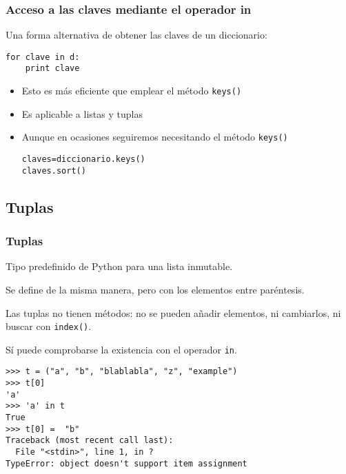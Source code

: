 \documentclass[ucs]{beamer}
\begin{document}
\begin{frame}[fragile]
\frametitle{Acceso a las claves mediante el operador in}

Una forma alternativa de obtener las claves de un diccionario:

  \begin{footnotesize}
  \begin{verbatim}
for clave in d:
    print clave
  \end{verbatim}
  \end{footnotesize}


\begin{itemize}
\item
Esto es más eficiente que emplear el método
 \verb|keys()|
\item
Es aplicable a listas y tuplas
\item
Aunque en ocasiones seguiremos necesitando el método 
 \verb|keys()|

  \begin{footnotesize}
  \begin{verbatim}
claves=diccionario.keys()
claves.sort()
  \end{verbatim}
  \end{footnotesize}
\end{itemize}

\end{frame}



\subsection{Tuplas}

\begin{frame}[fragile]
\frametitle{Tuplas}

Tipo predefinido de Python para una lista inmutable.

Se define de la misma manera, pero con los elementos entre paréntesis.

Las tuplas no tienen métodos: no se pueden añadir elementos, ni
cambiarlos, ni buscar con \verb|index()|.

Sí puede comprobarse la existencia con el operador \verb|in|.


\begin{scriptsize}
\begin{verbatim}
>>> t = ("a", "b", "blablabla", "z", "example") 
>>> t[0]                                       
'a'
>>> 'a' in t
True
>>> t[0] =  "b"
Traceback (most recent call last):
  File "<stdin>", line 1, in ?
TypeError: object doesn't support item assignment
\end{verbatim}
\end{scriptsize}

  
\end{frame}
\end{document}

